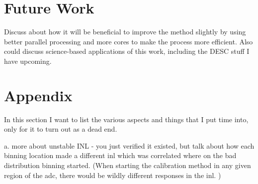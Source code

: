 \documentclass[11pt, letterpaper]{article}
\begin{document}
\section{Future Work}
Discuss about how it will be beneficial to improve the method slightly by using better parallel processing and more cores to make the process more efficient. Also could discuss science-based applications of this work, including the DESC stuff I have upcoming.

\section{Appendix}
In this section I want to list the various aspects and things that I put time into, only for it to turn out as a dead end. 

a. more about unstable INL - you just verified it existed, but talk about how each binning location made a different inl which was correlated where on the bad distribution binning started. (When starting the calibration method in any given region of the adc, there would be wildly different responses in the inl. ) 
\end{document}
